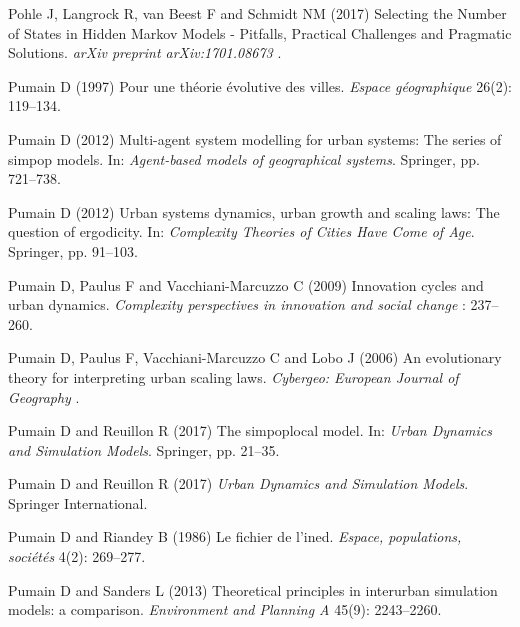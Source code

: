 \documentclass[Royal,sageh,times]{sagej}
\begin{document}
\begin{thebibliography}{51}
{Pohle} J, {Langrock} R, {van Beest} F and {Schmidt} NM (2017) {Selecting the
  Number of States in Hidden Markov Models - Pitfalls, Practical Challenges and
  Pragmatic Solutions}.
\newblock \emph{arXiv preprint arXiv:1701.08673} .

Pumain D (1997) Pour une th{\'e}orie {\'e}volutive des villes.
\newblock \emph{Espace g{\'e}ographique} 26(2): 119--134.

Pumain D (2012{}) Multi-agent system modelling for urban systems:
  The series of simpop models.
\newblock In: \emph{Agent-based models of geographical systems}. Springer, pp.
  721--738.

Pumain D (2012{}) Urban systems dynamics, urban growth and scaling
  laws: The question of ergodicity.
\newblock In: \emph{Complexity Theories of Cities Have Come of Age}. Springer,
  pp. 91--103.

Pumain D, Paulus F and Vacchiani-Marcuzzo C (2009) Innovation cycles and urban
  dynamics.
\newblock \emph{Complexity perspectives in innovation and social change} :
  237--260.

Pumain D, Paulus F, Vacchiani-Marcuzzo C and Lobo J (2006) An evolutionary
  theory for interpreting urban scaling laws.
\newblock \emph{Cybergeo: European Journal of Geography} .

Pumain D and Reuillon R (2017{}) The simpoplocal model.
\newblock In: \emph{Urban Dynamics and Simulation Models}. Springer, pp.
  21--35.

Pumain D and Reuillon R (2017{}) \emph{Urban Dynamics and
  Simulation Models}.
\newblock Springer International.

Pumain D and Riandey B (1986) Le fichier de l'ined.
\newblock \emph{Espace, populations, soci{\'e}t{\'e}s} 4(2): 269--277.

Pumain D and Sanders L (2013) Theoretical principles in interurban simulation
  models: a comparison.
\newblock \emph{Environment and Planning A} 45(9): 2243--2260.


\end{thebibliography}
\end{document}
